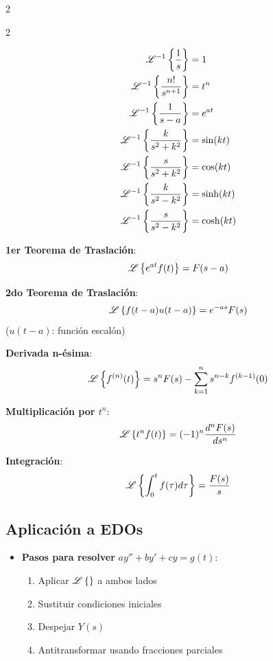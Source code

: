 \documentclass{article}
\begin{document}
\begin{multicols}{2}
\begin{multicols}{2}
        \columnbreak

        $$
        \begin{aligned}
          \mathscr{L}^{-1}\left\{\dfrac{1}{s}\right\} &= 1\\
          \mathscr{L}^{-1}\left\{\dfrac{n!}{s^{n+1}}\right\} &= t^n\\
          \mathscr{L}^{-1}\left\{\dfrac{1}{s - a}\right\} &= e^{at}\\
          \mathscr{L}^{-1}\left\{\dfrac{k}{s^2 + k^2}\right\} &= \sin(kt)\\
          \mathscr{L}^{-1}\left\{\dfrac{s}{s^2 + k^2}\right\} &= \cos(kt)\\
          \mathscr{L}^{-1}\left\{\dfrac{k}{s^2 - k^2}\right\} &= \sinh(kt)\\
          \mathscr{L}^{-1}\left\{\dfrac{s}{s^2 - k^2}\right\} &= \cosh(kt)\\
        \end{aligned}
        $$

      \end{multicols}

      \begin{itemform}
        \item \textbf{1er Teorema de Traslación}:
          $$\mathscr{L}\left\{e^{at}f(t)\right\} = F(s-a)$$

        \item \textbf{2do Teorema de Traslación}:
          $$\mathscr{L}\left\{f(t-a)u(t-a)\right\} = e^{-as}F(s)$$
          ($u(t-a)$: función escalón)

        \item \textbf{Derivada n-ésima}:
          $$\mathscr{L}\left\{f^{(n)}(t)\right\} = s^n F(s) - \sum_{k=1}^n s^{n-k}f^{(k-1)}(0)$$

        \item \textbf{Multiplicación por $t^n$}:
          $$\mathscr{L}\left\{t^n f(t)\right\} = (-1)^n \dfrac{d^n F(s)}{ds^n}$$

        \item \textbf{Integración}:
          $$\mathscr{L}\left\{\int_0^t f(\tau)d\tau\right\} = \dfrac{F(s)}{s}$$
      \end{itemform}

      \subsection*{Aplicación a EDOs}
      \begin{itemize}[leftmargin=*,noitemsep,topsep=0pt]
        \item \textbf{Pasos para resolver} $ay'' + by' + cy = g(t)$:
          \begin{enumerate}[leftmargin=*,noitemsep,topsep=0pt]
            \item Aplicar $\mathscr{L}\left\{\right\}$ a ambos lados
            \item Sustituir condiciones iniciales
            \item Despejar $Y(s)$
            \item Antitransformar usando fracciones parciales
          \end{enumerate}


\end{itemize}
\end{multicols}
\end{document}
